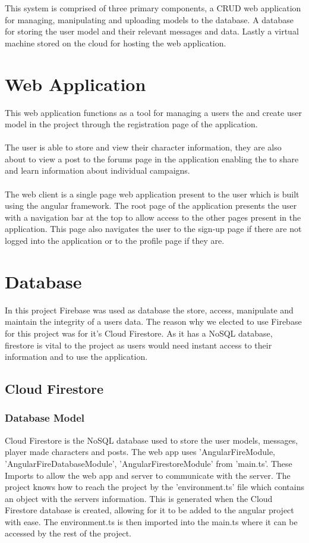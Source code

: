 This system is comprised of three primary components, a CRUD web application for managing, manipulating and uploading models to the database. A database for storing the user model and their relevant messages and data. Lastly a virtual machine stored on the cloud for hosting the web application.    

\section{Web Application}
This web application functions as a tool for managing a users
the and create user model in the project through the registration page of the application.  \\\\
The user is able to store and view their character information, they are also about to view a post to the forums page in the application enabling the to share and learn information about individual campaigns.  \\\\
The web client is a single page web application present to the user which is built using the angular framework.  The root page of the application presents the user with a navigation bar at the top to allow access to the other pages present in the application.  This page also navigates the user to the sign-up page if there are not logged into the application or to the profile page if they are.

\section{Database}
In this project Firebase was used as database the store, access, manipulate and maintain the integrity of a users data. The reason why we elected to use Firebase for this project was for it's Cloud Firestore. As it has a NoSQL database, firestore is vital to the project as users would need instant access to their information and to use the application.

\subsection{Cloud Firestore}
\subsubsection{Database Model}
Cloud Firestore is the NoSQL database used to store the user models, messages, player made characters and posts. The web app uses 'AngularFireModule, 'AngularFireDatabaseModule', 'AngularFirestoreModule' from 'main.ts'. These Imports to allow the web app and server to communicate with the server. The project knows how to reach the project by the 'environment.ts' file which contains an object with the servers information. This is generated when the Cloud Firestore database is created, allowing for it to be added to the angular project with ease. The environment.ts is then imported into the main.ts where it can be accessed by the rest of the project.

